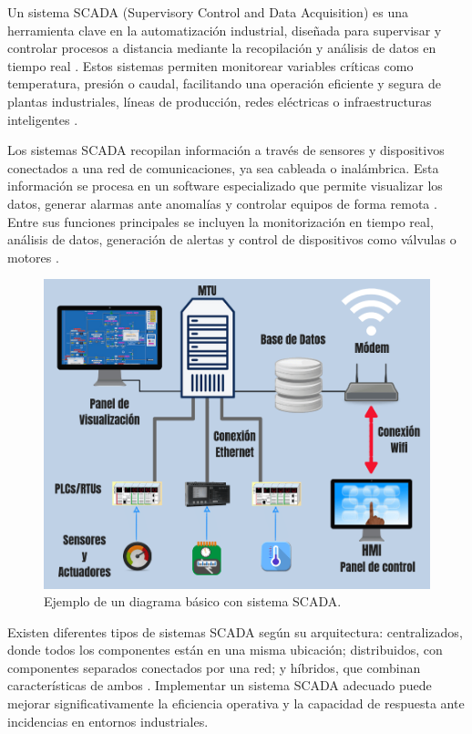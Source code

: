 Un sistema SCADA (Supervisory Control and Data Acquisition) es una herramienta clave en la automatización industrial, diseñada para supervisar y controlar procesos a distancia mediante la recopilación y análisis de datos en tiempo real \cite{scada}. Estos sistemas permiten monitorear variables críticas como temperatura, presión o caudal, facilitando una operación eficiente y segura de plantas industriales, líneas de producción, redes eléctricas o infraestructuras inteligentes \cite{scada}.

Los sistemas SCADA recopilan información a través de sensores y dispositivos conectados a una red de comunicaciones, ya sea cableada o inalámbrica. Esta información se procesa en un software especializado que permite visualizar los datos, generar alarmas ante anomalías y controlar equipos de forma remota \cite{scada}. Entre sus funciones principales se incluyen la monitorización en tiempo real, análisis de datos, generación de alertas y control de dispositivos como válvulas o motores \cite{scada}.

\begin{figure} [h!]
  \begin{center}
    \includegraphics[width=15cm]{figs/SCADA}
  \end{center}
  \caption{\centering Ejemplo de un diagrama básico con sistema SCADA. \cite{scada_img}}
  \label{fig:SCADA}
\end{figure} 

Existen diferentes tipos de sistemas SCADA según su arquitectura: centralizados, donde todos los componentes están en una misma ubicación; distribuidos, con componentes separados conectados por una red; y híbridos, que combinan características de ambos \cite{scada}. Implementar un sistema SCADA adecuado puede mejorar significativamente la eficiencia operativa y la capacidad de respuesta ante incidencias en entornos industriales.

